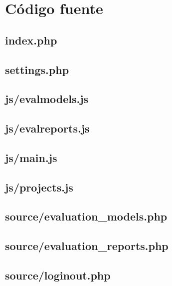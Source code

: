 \documentclass[12pt,a4paper,titlepage,spanish,twoside]{book}
\begin{document}
\section{Código fuente}
\subsection{index.php}


\subsection{settings.php}


\subsection{js/evalmodels.js}


\subsection{js/evalreports.js}


\subsection{js/main.js}


\subsection{js/projects.js}


\subsection{source/evaluation\_models.php}


\subsection{source/evaluation\_reports.php}


\subsection{source/loginout.php}

\end{document}
